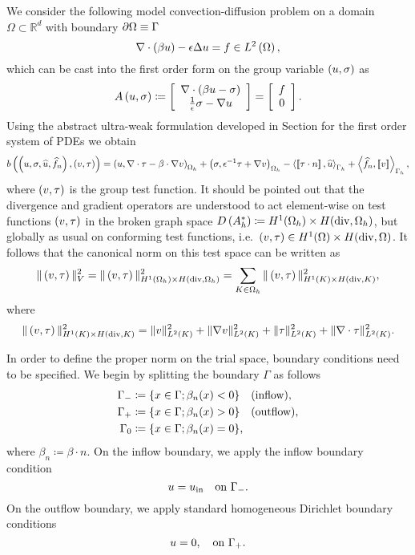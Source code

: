 We consider the following model convection-diffusion problem on a domain
$\Omega \subset \mathbb{R}^d$ with boundary $\pO \equiv \Gamma$
\begin{equation}
\div (\beta u) - \epsilon\Delta u = f  \in \L \label{primal},
\end{equation}
which can be cast into the first order form on the group variable
$\LRp{u,\sigma}$ as
\begin{equation}
\eqnlab{CDstrong}
A \LRp{u,\sigma} \coloneqq \LRs {
\begin{array}{c}
\div (\beta u - \sigma) \\ \frac{1}{\epsilon}\sigma - \grad u
\end{array}} = \LRs{
\begin{array}{c}
f \\ 0
\end{array}
}.
\end{equation}
Using the abstract ultra-weak formulation developed in Section
 for the first order system of PDEs  we
obtain
\begin{align*}
b\left(\left(u,\sigma, \widehat{u}, \widehat{f}_n\right),
\left( v, \tau \right)\right) = \left(u,\div \tau - \beta \cdot \grad
v\right)_{\Oh} + \left(\sigma, \epsilon^{-1} \tau + \grad v\right)_{\Oh} - \LRa{
\jump{\tau\cdot n}, \widehat{u} }_{\Gh} + \LRa{ \widehat{f}_n,
  \jump{v} }_{\Gh},
\end{align*}
where $\LRp{v, \tau}$ is the group test function. It should be pointed
out that the divergence and gradient operators are understood to act
element-wise on test functions $\LRp{v, \tau}$ in the broken graph
space $ D\LRp{A_h^*} \coloneqq  H^1(\Oh) \times H({\rm div}, \Oh)$, but
globally as usual on conforming test functions, i.e.\ $ \LRp{v, \tau}
\in  H^1(\Omega) \times H({\rm div}, \Omega)$. It follows that the
canonical norm on this test space can be written as
\[
\|\left(v, \tau\right)\|_V^2 = \|\left(v, \tau\right)\|_{H^1(\Oh) \times H({\rm div},\Oh)}^2
= \sum_{K\in \Oh} \|\left(v, \tau\right)\|_{H^1(K) \times H({\rm
    div},K)}^2,
\]
where
\[
\|\left(v, \tau \right)\|_{H^1(K) \times H({\rm div},K)}^2 =
\|v\|_{L^2(K)}^2 + \|\grad v\|_{L^2(K)}^2 + \|\tau\|_{L^2(K)}^2 +
\|\div \tau\|_{L^2(K)}^2.
\]

In order to define the proper norm on the trial space, boundary
conditions need to be specified. We begin by splitting the boundary
$\Gamma$ as follows
\begin{align*}
\Gamma_{-} &\coloneqq \{x\in \Gamma; \beta_n(x) < 0\} \quad {\rm
  (inflow)},\\ 
  \Gamma_{+} &\coloneqq \{x\in \Gamma; \beta_n(x) > 0\}
\quad {\rm (outflow)},\\ 
\Gamma_{0} &\coloneqq \{x\in \Gamma;
\beta_n(x) = 0\},
\end{align*}
where $\beta_n \coloneqq \beta \cdot n$.
On the inflow boundary, we apply the inflow boundary condition $$u = u_{\rm in} \quad \text{on }\Gm.$$  On the outflow boundary, we apply standard homogeneous Dirichlet boundary conditions
\[
u = 0, \quad \text{on } \Gp.
\]